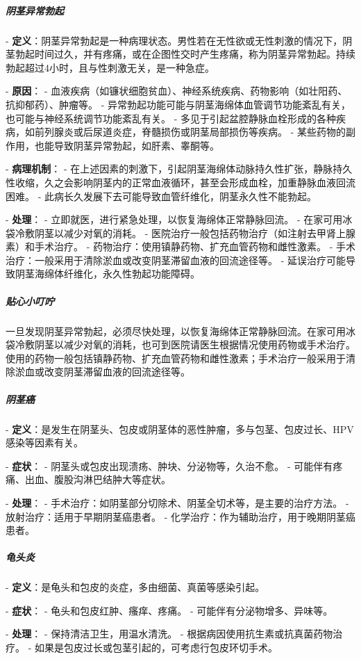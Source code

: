 \begin{enumerate}
\subparagraph{阴茎异常勃起}
- \textbf{定义}：阴茎异常勃起是一种病理状态。男性若在无性欲或无性刺激的情况下，阴茎勃起时间过久，并有疼痛，或在企图性交时产生疼痛，称为阴茎异常勃起。持续勃起超过4小时，且与性刺激无关，是一种急症。

- \textbf{原因}：
  - 血液疾病（如镰状细胞贫血）、神经系统疾病、药物影响（如壮阳药、抗抑郁药）、肿瘤等。
  - 异常勃起功能可能与阴茎海绵体血管调节功能紊乱有关，也可能与神经系统调节功能紊乱有关。
  - 多见于引起盆腔静脉血栓形成的各种疾病，如前列腺炎或后尿道炎症，脊髓损伤或阴茎局部损伤等疾病。
  - 某些药物的副作用，也能导致阴茎异常勃起，如肝素、睾酮等。

- \textbf{病理机制}：
  - 在上述因素的刺激下，引起阴茎海绵体动脉持久性扩张，静脉持久性收缩，久之会影响阴茎内的正常血液循环，甚至会形成血栓，加重静脉血液回流困难。
  - 此病长久发展下去可能导致血管纤维化，阴茎永久性不能勃起。

- \textbf{处理}：
  - 立即就医，进行紧急处理，以恢复海绵体正常静脉回流。
  - 在家可用冰袋冷敷阴茎以减少对氧的消耗。
  - 医院治疗一般包括药物治疗（如注射去甲肾上腺素）和手术治疗。
  - 药物治疗：使用镇静药物、扩充血管药物和雌性激素。
  - 手术治疗：一般采用于清除淤血或改变阴茎滞留血液的回流途径等。
  - 延误治疗可能导致阴茎海绵体纤维化，永久性勃起功能障碍。

\subparagraph{贴心小叮咛}

一旦发现阴茎异常勃起，必须尽快处理，以恢复海绵体正常静脉回流。在家可用冰袋冷敷阴茎以减少对氧的消耗，也可到医院请医生根据情况使用药物或手术治疗。使用的药物一般包括镇静药物、扩充血管药物和雌性激素；手术治疗一般采用于清除淤血或改变阴茎滞留血液的回流途径等。

\subparagraph{阴茎癌}
- \textbf{定义}：是发生在阴茎头、包皮或阴茎体的恶性肿瘤，多与包茎、包皮过长、HPV感染等因素有关。

- \textbf{症状}：
  - 阴茎头或包皮出现溃疡、肿块、分泌物等，久治不愈。
  - 可能伴有疼痛、出血、腹股沟淋巴结肿大等症状。

- \textbf{处理}：
  - 手术治疗：如阴茎部分切除术、阴茎全切术等，是主要的治疗方法。
  - 放射治疗：适用于早期阴茎癌患者。
  - 化学治疗：作为辅助治疗，用于晚期阴茎癌患者。

\subparagraph{龟头炎}
- \textbf{定义}：是龟头和包皮的炎症，多由细菌、真菌等感染引起。

- \textbf{症状}：
  - 龟头和包皮红肿、瘙痒、疼痛。
  - 可能伴有分泌物增多、异味等。

- \textbf{处理}：
  - 保持清洁卫生，用温水清洗。
  - 根据病因使用抗生素或抗真菌药物治疗。
  - 如果是包皮过长或包茎引起的，可考虑行包皮环切手术。


\end{enumerate}
